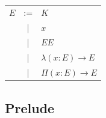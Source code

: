 \documentclass[11pt,oneside]{article}
\begin{document}
\begin{center}
\begin{tabular}{lcl}
      $E$ & :=& $K$ \\
          & | & $x$ \\
          & | & $E E$ \\
          & | & $\lambda (x: E) \rightarrow E$ \\
          & | & $\Pi (x: E) \rightarrow E$ \\
\end{tabular}
\end{center}

\newpage

  \subsection{Prelude}
\vspace{1cm}
\paragraph{}
\end{document}
